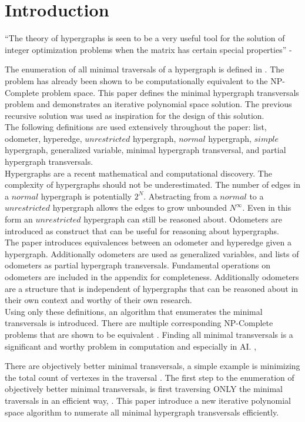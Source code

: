 \chapter{Introduction}

``The theory of hypergraphs is seen to be a very useful tool for the solution of integer optimization problems when the matrix has certain special properties'' - \cite{berge1984hypergraphs}

The enumeration of all minimal traversals of a hypergraph is  defined in \cite{berge1984hypergraphs}. The problem has already been shown to be computationally equivalent to the NP-Complete problem space. \cite{eiter1991transveral} This paper defines the minimal hypergraph transversals problem and demonstrates an iterative polynomial space solution. The previous recursive solution \cite{kavvadias2005efficient} was used as inspiration for the design of this solution.\\

The following definitions are used extensively throughout the paper: list, odometer, hyperedge, $unrestricted$ hypergraph, $normal$ hypergraph, $simple$ hypergraph, generalized variable, minimal hypergraph transversal, and partial hypergraph transversals.\\


Hypergraphs are a recent mathematical and computational discovery. The complexity of hypergraphs should not be underestimated. The number of edges in a $normal$ hypergraph is potentially $2^N$. Abstracting from a $normal$ to a $unrestricted$ hypergraph allows the edges to grow unbounded $N^\infty$. Even in this form an $unrestricted$ hypergraph can still be reasoned about. Odometers \cite{Odometer:Fuchs} are introduced as construct that can be useful for reasoning about hypergraphs. \\


The paper introduces equivalences between an odometer and hyperedge given a hypergraph. Additionally odometers are used as generalized variables, and lists of odometers as partial hypergraph transversals. Fundamental operations on odometers are included in the appendix for completeness. Additionally odometers are a structure that is independent of hypergraphs that can be reasoned about in their own context and worthy of their own research.\\

Using only these definitions, an algorithm that enumerates the minimal transversals is introduced. There are multiple corresponding NP-Complete problems that are shown to be equivalent \cite{eiter1995identifying}. Finding all minimal transversals is a significant and worthy problem in computation and especially in AI. \cite{reiter1987theory}, \cite{de1987diagnosing}

There are objectively better minimal transversals, a simple example is minimizing the total count of vertexes in the traversal \cite{bailey2003fast}. The first step to the enumeration of objectively better minimal transversals, is first traversing ONLY the minimal traversals in an efficient way, \cite{boros2003efficient}. This paper introduce a new iterative polynomial space algorithm to numerate all minimal hypergraph transversals efficiently.